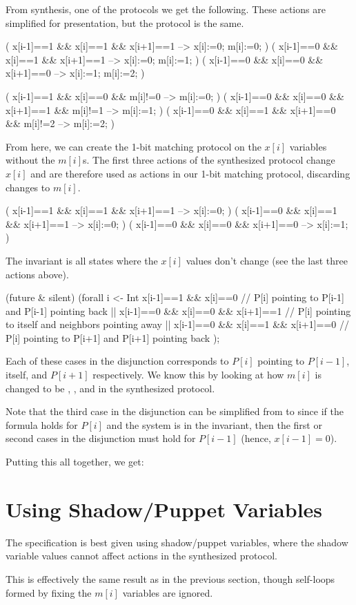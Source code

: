 From synthesis, one of the protocols we get the following.
These actions are simplified for presentation, but the protocol is the same.
\begin{code}
( x[i-1]==1 && x[i]==1 && x[i+1]==1 --> x[i]:=0; m[i]:=0; )
( x[i-1]==0 && x[i]==1 && x[i+1]==1 --> x[i]:=0; m[i]:=1; )
( x[i-1]==0 && x[i]==0 && x[i+1]==0 --> x[i]:=1; m[i]:=2; )

( x[i-1]==1 && x[i]==0              && m[i]!=0 --> m[i]:=0; )
( x[i-1]==0 && x[i]==0 && x[i+1]==1 && m[i]!=1 --> m[i]:=1; )
( x[i-1]==0 && x[i]==1 && x[i+1]==0 && m[i]!=2 --> m[i]:=2; )
\end{code}

From here, we can create the 1-bit matching protocol on the $x[i]$ variables without the $m[i]$s.
The first three actions of the synthesized protocol change $x[i]$ and are therefore used as actions in our 1-bit matching protocol, discarding changes to $m[i]$.
\begin{code}
( x[i-1]==1 && x[i]==1 && x[i+1]==1 --> x[i]:=0; )
( x[i-1]==0 && x[i]==1 && x[i+1]==1 --> x[i]:=0; )
( x[i-1]==0 && x[i]==0 && x[i+1]==0 --> x[i]:=1; )
\end{code}

The invariant is all states where the $x[i]$ values don't change (see the last three actions above).
\begin{code}
(future & silent)
  (forall i <- Int %
      x[i-1]==1 && x[i]==0               // P[i] pointing to P[i-1] and P[i-1] pointing back
   || x[i-1]==0 && x[i]==0 && x[i+1]==1  // P[i] pointing to itself and neighbors pointing away
   || x[i-1]==0 && x[i]==1 && x[i+1]==0  // P[i] pointing to P[i+1] and P[i+1] pointing back
  );
\end{code}
Each of these cases in the disjunction corresponds to $P[i]$ pointing to $P[i-1]$, itself, and $P[i+1]$ respectively.
We know this by looking at how $m[i]$ is changed to be , , and  in the synthesized protocol.

Note that the third case in the disjunction can be simplified from  to  since if the formula holds for $P[i]$ and the system is in the invariant, then the first or second cases in the disjunction must hold for $P[i-1]$ (hence, $x[i-1]=0$).

Putting this all together, we get:

\section{Using Shadow/Puppet Variables}

The specification is best given using shadow/puppet variables, where the shadow variable values cannot affect actions in the synthesized protocol.

This is effectively the same result as in the previous section, though self-loops formed by fixing the $m[i]$ variables are ignored.



